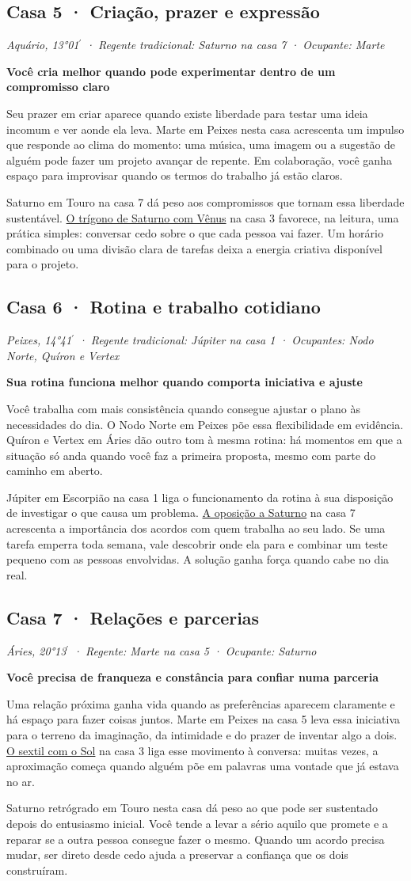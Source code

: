 \documentclass[11pt,a4paper]{article}
\newcommand{\leitura}[3]{\subsection{#1}\textit{#2}\par #3}
\newcommand{\subtituloleitura}[1]{\textbf{#1}\par\nopagebreak[4]}
\newcommand{\aspectoref}[2]{\hyperref[#1]{#2}}
\begin{document}
\leitura{Casa 5 · Criação, prazer e expressão}{Aquário, 13°01\ensuremath{^{\prime}} · Regente tradicional: Saturno na casa 7 · Ocupante: Marte}{
\subtituloleitura{Você cria melhor quando pode experimentar dentro de um compromisso claro}
Seu prazer em criar aparece quando existe liberdade para testar uma ideia incomum e ver aonde ela leva. Marte em Peixes nesta casa acrescenta um impulso que responde ao clima do momento: uma música, uma imagem ou a sugestão de alguém pode fazer um projeto avançar de repente. Em colaboração, você ganha espaço para improvisar quando os termos do trabalho já estão claros.

Saturno em Touro na casa 7 dá peso aos compromissos que tornam essa liberdade sustentável. \aspectoref{aspecto:venus-saturno}{O trígono de Saturno com Vênus} na casa 3 favorece, na leitura, uma prática simples: conversar cedo sobre o que cada pessoa vai fazer. Um horário combinado ou uma divisão clara de tarefas deixa a energia criativa disponível para o projeto.
}

\leitura{Casa 6 · Rotina e trabalho cotidiano}{Peixes, 14°41\ensuremath{^{\prime}} · Regente tradicional: Júpiter na casa 1 · Ocupantes: Nodo Norte, Quíron e Vertex}{
\label{casa-6}\subtituloleitura{Sua rotina funciona melhor quando comporta iniciativa e ajuste}
Você trabalha com mais consistência quando consegue ajustar o plano às necessidades do dia. O Nodo Norte em Peixes põe essa flexibilidade em evidência. Quíron e Vertex em Áries dão outro tom à mesma rotina: há momentos em que a situação só anda quando você faz a primeira proposta, mesmo com parte do caminho em aberto.

Júpiter em Escorpião na casa 1 liga o funcionamento da rotina à sua disposição de investigar o que causa um problema. \aspectoref{aspecto:jupiter-saturno}{A oposição a Saturno} na casa 7 acrescenta a importância dos acordos com quem trabalha ao seu lado. Se uma tarefa emperra toda semana, vale descobrir onde ela para e combinar um teste pequeno com as pessoas envolvidas. A solução ganha força quando cabe no dia real.
}

\leitura{Casa 7 · Relações e parcerias}{Áries, 20°13\ensuremath{^{\prime}} · Regente: Marte na casa 5 · Ocupante: Saturno}{
\label{casa-7}\subtituloleitura{Você precisa de franqueza e constância para confiar numa parceria}
Uma relação próxima ganha vida quando as preferências aparecem claramente e há espaço para fazer coisas juntos. Marte em Peixes na casa 5 leva essa iniciativa para o terreno da imaginação, da intimidade e do prazer de inventar algo a dois. \aspectoref{aspecto:sol-marte}{O sextil com o Sol} na casa 3 liga esse movimento à conversa: muitas vezes, a aproximação começa quando alguém põe em palavras uma vontade que já estava no ar.

Saturno retrógrado em Touro nesta casa dá peso ao que pode ser sustentado depois do entusiasmo inicial. Você tende a levar a sério aquilo que promete e a reparar se a outra pessoa consegue fazer o mesmo. Quando um acordo precisa mudar, ser direto desde cedo ajuda a preservar a confiança que os dois construíram.
}
\end{document}
